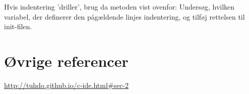 \documentclass[a4paper, 9pt]{article}
\begin{document}
\noindent
Hvis indentering 'driller', brug da metoden vist ovenfor: Undersøg, hvilken variabel, der definerer den pågældende linjes indentering, og tilføj rettelsen til init-filen.


\newpage
\section{Øvrige referencer}
\url{http://tuhdo.github.io/c-ide.html#sec-2}
\end{document}
